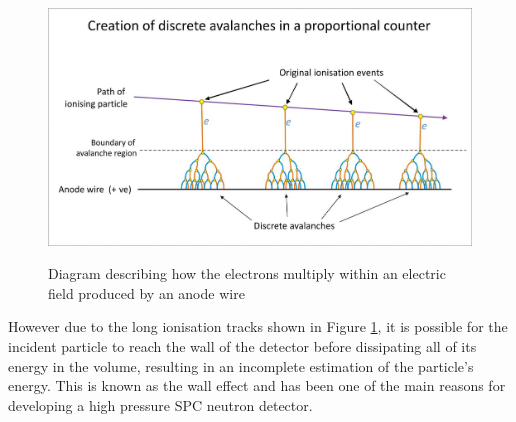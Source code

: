 \documentclass[a4paper]{article}
\begin{document}
\begin{figure}[H]
    \centering
    \includegraphics[height=7cm]{plots/avalanches.jpg}
    \caption{Diagram describing how the electrons multiply within an electric field produced by an anode wire \cite{wikipedia_2021}}
    \label{fig:avala}
\end{figure}
\noindent However due to the long ionisation tracks shown in Figure \ref{fig:avala}, it is possible for the incident particle to reach the wall of the detector before dissipating all of its energy in the volume, resulting in an incomplete estimation of the particle's energy. This is known as the wall effect and has been one of the main reasons for developing a high pressure SPC neutron detector.
\end{document}
